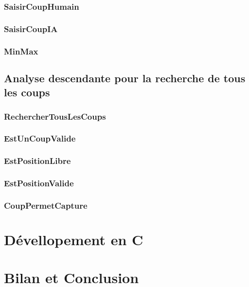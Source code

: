     \subsubsection{SaisirCoupHumain}
      
    \subsubsection{SaisirCoupIA}
      
    \subsubsection{MinMax}
      


  \subsection{Analyse descendante pour la recherche de tous les coups}
    \subsubsection{RechercherTousLesCoups}
      
    \subsubsection{EstUnCoupValide}
      
    \subsubsection{EstPositionLibre}
      
    \subsubsection{EstPositionValide}
      
    \subsubsection{CoupPermetCapture}
      

  \newpage
  \section{Dévellopement en C}
    

  \newpage
  \section{Bilan et Conclusion}
    


